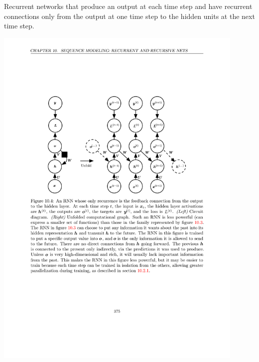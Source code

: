 \documentclass[12pt, a4paper]{article}
\begin{document}
\subsubsection{}
Recurrent networks that produce an output at each time step and have recurrent connections only from the output at one time step to the hidden units at the next time step.
\begin{center}
    \includegraphics[width=0.9\textwidth]{../imgs/RNN_2.pdf}
\end{center}
\end{document}

